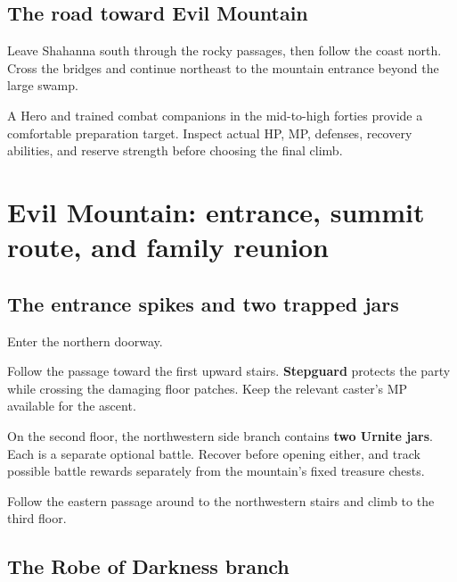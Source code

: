 \subsection*{The road toward Evil Mountain}

Leave Shahanna south through the rocky passages, then follow
the coast north. Cross the bridges and continue northeast
to the mountain entrance beyond the large swamp.

A Hero and trained combat companions in the mid-to-high forties
provide a comfortable preparation target. Inspect actual HP,
MP, defenses, recovery abilities, and reserve strength before
choosing the final climb.

\section{Evil Mountain: entrance, summit route, and family reunion}

\subsection*{The entrance spikes and two trapped jars}

Enter the northern doorway.


Follow the passage toward the first upward stairs.
\textbf{Stepguard} protects the party
while crossing the damaging floor patches. Keep the relevant
caster's MP available for the ascent.

On the second floor, the northwestern side branch contains
\textbf{two Urnite jars}. Each is a separate optional battle.
Recover before opening either, and track possible battle rewards
separately from the mountain's fixed treasure chests.

Follow the eastern passage around to the northwestern stairs
and climb to the third floor.

\subsection*{The Robe of Darkness branch}

